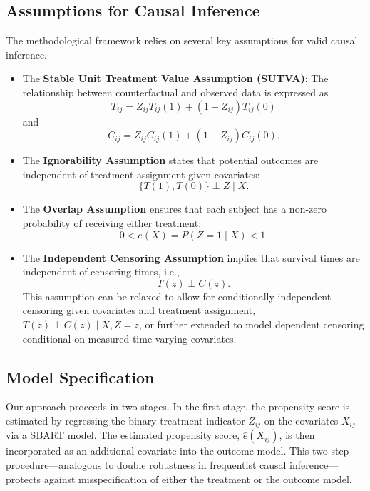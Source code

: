 \documentclass[useAMS,referee]{biom}
\begin{document}
\subsection{Assumptions for Causal Inference}

The methodological framework relies on several key assumptions for valid causal inference. 
\begin{itemize}
   \item The \textbf{Stable Unit Treatment Value Assumption (SUTVA)}: The relationship between counterfactual and observed data is expressed as 
   \[
   T_{ij} = Z_{ij} T_{ij}(1) + (1 - Z_{ij}) T_{ij}(0)
   \]
   and 
   \[
   C_{ij} = Z_{ij} C_{ij}(1) + (1 - Z_{ij}) C_{ij}(0).
   \]
   \item The \textbf{Ignorability Assumption} states that potential outcomes are independent of treatment assignment given covariates: 
   \[
   \{T(1), T(0)\} \perp Z \mid X.
   \]
   \item The \textbf{Overlap Assumption} ensures that each subject has a non-zero probability of receiving either treatment: 
   \[
   0 < e(X) = P(Z = 1 \mid X) < 1.
   \]
   \item The \textbf{Independent Censoring Assumption} implies that survival times are independent of censoring times, i.e., 
   \[
   T(z) \perp C(z).
   \]
   This assumption can be relaxed to allow for conditionally independent censoring given covariates and treatment assignment, \( T(z) \perp C(z) \mid X, Z = z \), or further extended to model dependent censoring conditional on measured time-varying covariates.
\end{itemize}  

\subsection{Model Specification}

Our approach proceeds in two stages. In the first stage, the propensity score is estimated by regressing the binary treatment indicator \( Z_{ij} \) on the covariates \( X_{ij} \) via a SBART model. The estimated propensity score, \(\hat{e}(X_{ij})\), is then incorporated as an additional covariate into the outcome model. This two‐step procedure—analogous to double robustness in frequentist causal inference—protects against misspecification of either the treatment or the outcome model.
\end{document}
